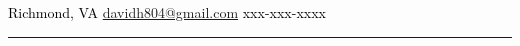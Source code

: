 \documentclass[10pt,A4]{article}
\begin{document}
\pagestyle{fancy}	

\begin{minipage}[c][0.085\textheight][t]{\linewidth}
\begin{center}
	\vspace{14pt}
	\textcolor{black}{\small{  Richmond, VA  \hspace{12pt}    \href{mailto:davidh804@gmail.com}{davidh804@gmail.com}  \hspace{12pt}     xxx-xxx-xxxx}} \\ \hspace{22pt}
        \hspace{16pt}\textcolor{sectcol}{\rule[-1mm]{2pt}{0.9cm}}\hspace{12pt}


\end{center}
\end{minipage}\\[-4pt]

\end{document}
